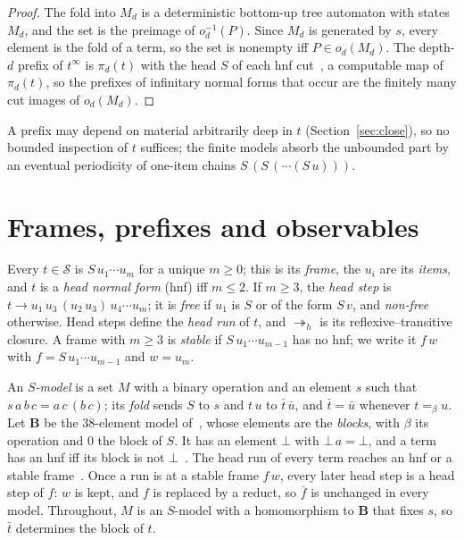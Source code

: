\documentclass[11pt]{amsart}
\theoremstyle{definition}
\newcommand{\Ter}{\mathcal S}
\newcommand{\B}{\mathbf B}
\newcommand{\hred}{\twoheadrightarrow_h}
\newcommand{\conv}{=_\beta}
\begin{document}
\begin{proof}
The fold into $M_d$ is a deterministic bottom-up tree automaton with states $M_d$, and the set is
the preimage of $o_d^{-1}(P)$. Since $M_d$ is generated by $s$, every element is the fold of a term, so
the set is nonempty iff $P\in o_d(M_d)$. The depth-$d$ prefix of $t^\infty$ is $\pi_d(t)$ with the head
$S$ of each hnf cut~\citep{s5}, a computable map of $\pi_d(t)$, so the prefixes of infinitary normal
forms that occur are the finitely many cut images of $o_d(M_d)$.
\end{proof}

A prefix may depend on material arbitrarily deep in $t$ (Section~\ref{sec:close}), so no bounded
inspection of $t$ suffices; the finite models absorb the unbounded part by an eventual periodicity of
one-item chains $S\,(S\,(\cdots(S\,u)))$.

\section{Frames, prefixes and observables}

Every $t\in\Ter$ is $S\,u_1\cdots u_m$ for a unique $m\ge0$; this is its \emph{frame}, the $u_i$ are its
\emph{items}, and $t$ is a \emph{head normal form} (hnf) iff $m\le2$. If $m\ge3$, the \emph{head step}
is $t\to u_1\,u_3\,(u_2\,u_3)\,u_4\cdots u_m$; it is \emph{free} if $u_1$ is $S$ or of the form
$S\,v$, and \emph{non-free} otherwise. Head steps define the \emph{head run} of $t$, and
$\hred$ is its reflexive--transitive closure. A frame with $m\ge3$ is \emph{stable} if
$S\,u_1\cdots u_{m-1}$ has no hnf; we write it $f\,w$ with $f=S\,u_1\cdots u_{m-1}$ and $w=u_m$.

An \emph{$S$-model} is a set $M$ with a binary operation and an element $s$ such that
$s\,a\,b\,c=a\,c\,(b\,c)$; its \emph{fold} sends $S$ to $s$ and $t\,u$ to $\bar t\,\bar u$, and
$\bar t=\bar u$ whenever $t\conv u$. Let $\B$ be the 38-element model of~\citep{s1}, whose elements
are the \emph{blocks}, with $\beta$ its operation and $0$ the block of $S$. It has an element $\bot$
with $\bot\,a=\bot$, and a term has an hnf iff its block is not $\bot$~\citep{s1}. The head run of every
term reaches an hnf or a stable frame~\citep{s1,s3}. Once a run is at a stable frame $f\,w$, every
later head step is a head step of $f$: $w$ is kept, and $f$ is replaced by a reduct, so $\bar f$ is unchanged in every model. Throughout,
$M$ is an $S$-model with a homomorphism to $\B$ that fixes $s$, so $\bar t$ determines the block of $t$.
\end{document}
